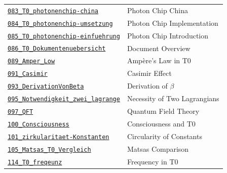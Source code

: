 {\begin{longtable}{@{}>{\raggedright\arraybackslash}p{} >{\raggedright\arraybackslash}p{}@{}}
\href{https://github.com/jpascher/T0-Time-Mass-Duality/blob/main/2/pdf/083_T0_photonenchip-china_De.pdf}{\texttt{083\_T0\_photonenchip-china}} & Photon Chip China \\
\href{https://github.com/jpascher/T0-Time-Mass-Duality/blob/main/2/pdf/084_T0_photonenchip-umsetzung_De.pdf}{\texttt{084\_T0\_photonenchip-umsetzung}} & Photon Chip Implementation \\
\href{https://github.com/jpascher/T0-Time-Mass-Duality/blob/main/2/pdf/085_T0_photonenchip-einfuehrung_De.pdf}{\texttt{085\_T0\_photonenchip-einfuehrung}} & Photon Chip Introduction \\
\href{https://github.com/jpascher/T0-Time-Mass-Duality/blob/main/2/pdf/086_T0_Dokumentenuebersicht_De.pdf}{\texttt{086\_T0\_Dokumentenuebersicht}} & Document Overview \\
\href{https://github.com/jpascher/T0-Time-Mass-Duality/blob/main/2/pdf/089_Amper_Low_De.pdf}{\texttt{089\_Amper\_Low}} & Ampère's Law in T0 \\
\href{https://github.com/jpascher/T0-Time-Mass-Duality/blob/main/2/pdf/091_Casimir_De.pdf}{\texttt{091\_Casimir}} & Casimir Effect \\
\href{https://github.com/jpascher/T0-Time-Mass-Duality/blob/main/2/pdf/093_DerivationVonBeta_De.pdf}{\texttt{093\_DerivationVonBeta}} & Derivation of $\beta$ \\
\href{https://github.com/jpascher/T0-Time-Mass-Duality/blob/main/2/pdf/095_Notwendigkeit_zwei_lagrange_De.pdf}{\texttt{095\_Notwendigkeit\_zwei\_lagrange}} & Necessity of Two Lagrangians \\
\href{https://github.com/jpascher/T0-Time-Mass-Duality/blob/main/2/pdf/097_QFT_De.pdf}{\texttt{097\_QFT}} & Quantum Field Theory \\
\href{https://github.com/jpascher/T0-Time-Mass-Duality/blob/main/2/pdf/100_Consciousness_De.pdf}{\texttt{100\_Consciousness}} & Consciousness and T0 \\
\href{https://github.com/jpascher/T0-Time-Mass-Duality/blob/main/2/pdf/101_zirkularitaet-Konstanten_De.pdf}{\texttt{101\_zirkularitaet-Konstanten}} & Circularity of Constants \\
\href{https://github.com/jpascher/T0-Time-Mass-Duality/blob/main/2/pdf/105_Matsas_T0_Vergleich_De.pdf}{\texttt{105\_Matsas\_T0\_Vergleich}} & Matsas Comparison \\
\href{https://github.com/jpascher/T0-Time-Mass-Duality/blob/main/2/pdf/114_T0_freqeunz_De.pdf}{\texttt{114\_T0\_freqeunz}} & Frequency in T0 \\

\end{longtable}}
